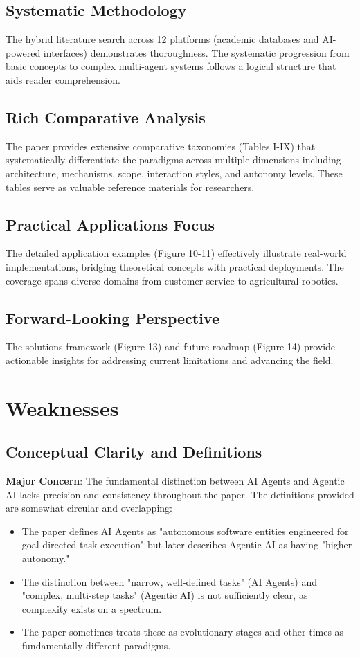 \documentclass[12pt]{article}
\begin{document}
\subsection{Systematic Methodology}
The hybrid literature search across 12 platforms (academic databases and AI-powered interfaces) demonstrates thoroughness. The systematic progression from basic concepts to complex multi-agent systems follows a logical structure that aids reader comprehension.

\subsection{Rich Comparative Analysis}
The paper provides extensive comparative taxonomies (Tables I-IX) that systematically differentiate the paradigms across multiple dimensions including architecture, mechanisms, scope, interaction styles, and autonomy levels. These tables serve as valuable reference materials for researchers.

\subsection{Practical Applications Focus}
The detailed application examples (Figure 10-11) effectively illustrate real-world implementations, bridging theoretical concepts with practical deployments. The coverage spans diverse domains from customer service to agricultural robotics.

\subsection{Forward-Looking Perspective}
The solutions framework (Figure 13) and future roadmap (Figure 14) provide actionable insights for addressing current limitations and advancing the field.

\section{Weaknesses}

\subsection{Conceptual Clarity and Definitions}
\textbf{Major Concern}: The fundamental distinction between AI Agents and Agentic AI lacks precision and consistency throughout the paper. The definitions provided are somewhat circular and overlapping:

\begin{itemize}
\item The paper defines AI Agents as "autonomous software entities engineered for goal-directed task execution" but later describes Agentic AI as having "higher autonomy."
\item The distinction between "narrow, well-defined tasks" (AI Agents) and "complex, multi-step tasks" (Agentic AI) is not sufficiently clear, as complexity exists on a spectrum.
\item The paper sometimes treats these as evolutionary stages and other times as fundamentally different paradigms.
\end{itemize}
\end{document}

